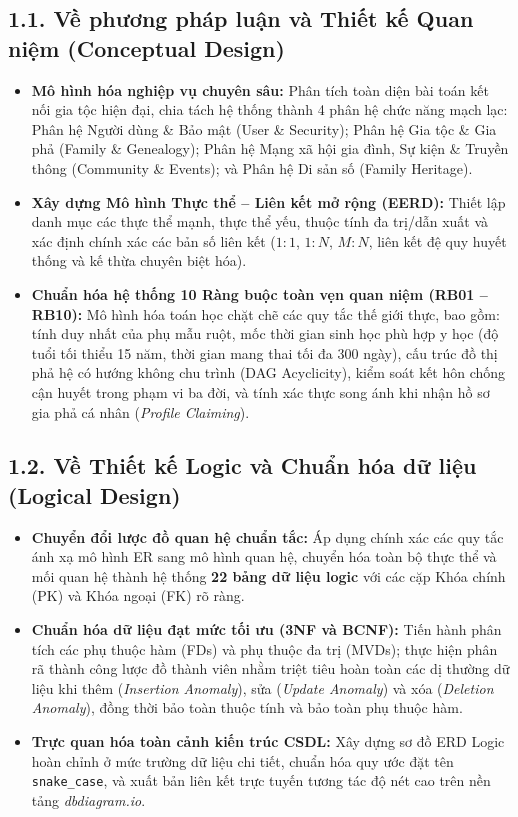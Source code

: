 \subsection*{1.1. Về phương pháp luận và Thiết kế Quan niệm (Conceptual Design)}
{}
\begin{itemize}[leftmargin=*]
    \item \textbf{Mô hình hóa nghiệp vụ chuyên sâu:} Phân tích toàn diện bài toán kết nối gia tộc hiện đại, chia tách hệ thống thành 4 phân hệ chức năng mạch lạc: Phân hệ Người dùng \& Bảo mật (User \& Security); Phân hệ Gia tộc \& Gia phả (Family \& Genealogy); Phân hệ Mạng xã hội gia đình, Sự kiện \& Truyền thông (Community \& Events); và Phân hệ Di sản số (Family Heritage).
    \item \textbf{Xây dựng Mô hình Thực thể -- Liên kết mở rộng (EERD):} Thiết lập danh mục các thực thể mạnh, thực thể yếu, thuộc tính đa trị/dẫn xuất và xác định chính xác các bản số liên kết ($1:1$, $1:N$, $M:N$, liên kết đệ quy huyết thống và kế thừa chuyên biệt hóa).
    \item \textbf{Chuẩn hóa hệ thống 10 Ràng buộc toàn vẹn quan niệm (RB01 -- RB10):} Mô hình hóa toán học chặt chẽ các quy tắc thế giới thực, bao gồm: tính duy nhất của phụ mẫu ruột, mốc thời gian sinh học phù hợp y học (độ tuổi tối thiểu 15 năm, thời gian mang thai tối đa 300 ngày), cấu trúc đồ thị phả hệ có hướng không chu trình (DAG Acyclicity), kiểm soát kết hôn chống cận huyết trong phạm vi ba đời, và tính xác thực song ánh khi nhận hồ sơ gia phả cá nhân (\textit{Profile Claiming}).
\end{itemize}

\subsection*{1.2. Về Thiết kế Logic và Chuẩn hóa dữ liệu (Logical Design)}
{}
\begin{itemize}[leftmargin=*]
    \item \textbf{Chuyển đổi lược đồ quan hệ chuẩn tắc:} Áp dụng chính xác các quy tắc ánh xạ mô hình ER sang mô hình quan hệ, chuyển hóa toàn bộ thực thể và mối quan hệ thành hệ thống \textbf{22 bảng dữ liệu logic} với các cặp Khóa chính (PK) và Khóa ngoại (FK) rõ ràng.
    \item \textbf{Chuẩn hóa dữ liệu đạt mức tối ưu (3NF và BCNF):} Tiến hành phân tích các phụ thuộc hàm (FDs) và phụ thuộc đa trị (MVDs); thực hiện phân rã thành công lược đồ thành viên nhằm triệt tiêu hoàn toàn các dị thường dữ liệu khi thêm (\textit{Insertion Anomaly}), sửa (\textit{Update Anomaly}) và xóa (\textit{Deletion Anomaly}), đồng thời bảo toàn thuộc tính và bảo toàn phụ thuộc hàm.
    \item \textbf{Trực quan hóa toàn cảnh kiến trúc CSDL:} Xây dựng sơ đồ ERD Logic hoàn chỉnh ở mức trường dữ liệu chi tiết, chuẩn hóa quy ước đặt tên \texttt{snake\_case}, và xuất bản liên kết trực tuyến tương tác độ nét cao trên nền tảng \textit{dbdiagram.io}.
\end{itemize}

